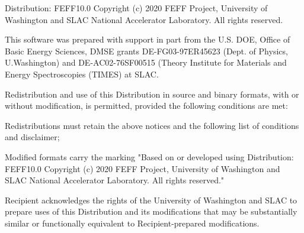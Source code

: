 \documentclass[11pt,oneside]{report} %
\newcommand{\program}[1]{\textsc{#1}}
\newcommand{\feff}{\program{feff}}
\begin{document}
\begin{latexonly}
%
%
%
%
%
%

Distribution:  FEFF10.0
Copyright (c) 2020 FEFF Project, University of Washington and
SLAC National Accelerator Laboratory.  All rights reserved.  
 
This software was prepared with support in part from the U.S. DOE,
Office of Basic Energy Sciences, DMSE grants DE-FG03-97ER45623
(Dept. of Physics, U.Washington) and DE-AC02-76SF00515 (Theory
Institute for Materials and Energy Spectroscopies (TIMES) at SLAC. 

Redistribution and use of this Distribution in source and binary
formats, with or without modification, is permitted, provided the 
following conditions are met:

Redistributions must retain the above notices and the following list
of conditions and disclaimer;

Modified formats carry the marking
    "Based on or developed using Distribution: FEFF10.0
Copyright (c) 2020 FEFF Project, University of Washington and
SLAC National Accelerator Laboratory.  All rights reserved." 

Recipient acknowledges the rights of the University of Washington
and SLAC to prepare uses of this Distribution and its modifications that
may be substantially similar or functionally equivalent to
Recipient-prepared modifications.


\end{latexonly}
\end{document}
